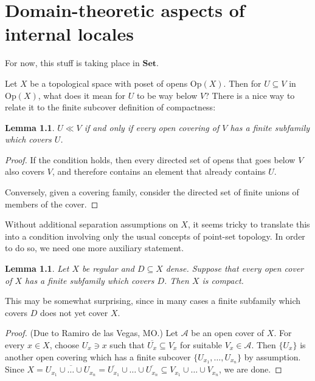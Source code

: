 \documentclass[11pt, oneside, article]{memoir}
\theoremstyle{plain}
\newtheorem{lemma}[theorem]{Lemma}
\theoremstyle{definition}
\theoremstyle{remark}
\newcommand{\Set}[1]{\mathrm{#1}}
\newcommand{\Cat}[1]{\mathbf{#1}}
\newcommand{\smset}{\Cat{Set}}
\newcommand{\Op}{\Set{Op}}
\begin{document}
\chapter{Domain-theoretic aspects of internal locales}

For now, this stuff is taking place in $\smset$.

Let $X$ be a topological space with poset of opens $\Op(X)$. Then for $U\subseteq V$ in $\Op(X)$, what does it mean for $U$ to be way below $V$? There is a nice way to relate it to the finite subcover definition of compactness:

\begin{lemma}
$U\ll V$ if and only if every open covering of $V$ has a finite subfamily which covers $U$.
\end{lemma}

\begin{proof}
If the condition holds, then every directed set of opens that goes below $V$ also covers $V$, and therefore contains an element that already contains $U$.

Conversely, given a covering family, consider the directed set of finite unions of members of the cover.
\end{proof}

Without additional separation assumptions on $X$, it seems tricky to translate this into a condition involving only the usual concepts of point-set topology. In order to do so, we need one more auxiliary statement.

\newcommand{\cl}[1]{\overline{#1}} %
\newcommand{\intr}[1]{\mathrm{int}(#1)} %

\begin{lemma}
Let $X$ be regular and $D\subseteq X$ dense. Suppose that every open cover of $X$ has a finite subfamily which covers $D$. Then $X$ is compact.
\end{lemma}

This may be somewhat surprising, since in many cases a finite subfamily which covers $D$ does not yet cover $X$.

\begin{proof}(Due to Ramiro de las Vegas, MO.)
Let $\mathcal{A}$ be an open cover of $X$. For every $x\in X$, choose $U_x\ni x$ such that $\cl{U_x}\subseteq V_x$ for suitable $V_x\in\mathcal{A}$. Then $\{U_x\}$ is another open covering which has a finite subcover $\{U_{x_1},\ldots,U_{x_n}\}$ by assumption. Since $X = \cl{U_{x_1}\cup\ldots\cup U_{x_n}} = \cl{U_{x_1}}\cup\ldots\cup\cl{U_{x_n}} \subseteq V_{x_1}\cup\ldots\cup V_{x_n}$, we are done.
\end{proof}
\end{document}
